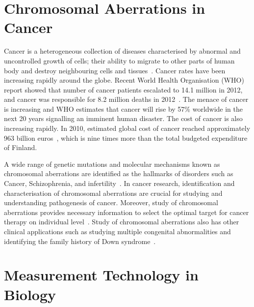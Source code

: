
\section{Chromosomal Aberrations in Cancer}
\label{s:cancer}


Cancer is a heterogeneous collection of diseases characterised 
by abnormal and uncontrolled growth of cells; their ability to 
migrate to other parts of human body and destroy neighbouring cells
and tissues~\cite{bishop99}. Cancer rates have been increasing rapidly
around the globe. Recent World Health Organisation (WHO) report
showed that number of cancer patients escalated to 14.1 million 
in 2012, and  cancer was responsible for 8.2 million deaths in 
2012~\cite{who2014}. 
The menace of cancer is increasing and WHO estimates that cancer 
will  rise by 57\% worldwide in the next 20 years signalling an imminent
human disaster. The cost of cancer is also increasing rapidly. In 2010, 
estimated global cost of cancer reached approximately 963 billion 
euros~\cite{who2014}, which is nine times more than the total 
budgeted expenditure of Finland. 

A wide range of genetic mutations and molecular mechanisms known 
as chromosomal aberrations are identified as the hallmarks
of  disorders such as Cancer, Schizophrenia, and 
infertility~\cite{vogelstein2002}. In cancer research, 
identification and characterisation of chromosomal aberrations 
are crucial for studying and understanding pathogenesis of cancer. 
Moreover, study of chromosomal aberrations provides necessary 
information to select the optimal target for cancer therapy on 
individual level~\cite{kirsch1993causes}. Study of chromosomal 
aberrations also has other clinical applications such as 
studying multiple congenital abnormalities and identifying
the family history of Down syndrome~\cite{obe2007chromosomal}. 



\section{Measurement Technology in Biology}
\label{s:biologymeasure}



